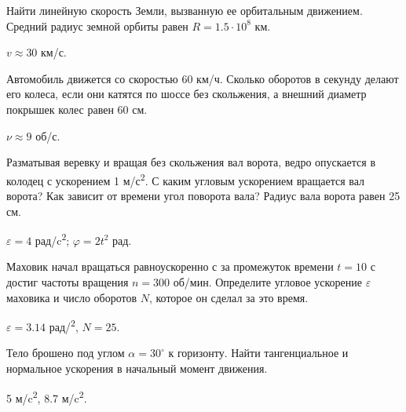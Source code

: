 \begin{ex} %
Найти линейную скорость Земли, вызванную ее орбитальным движением. Средний радиус земной орбиты равен $R = 1.5 \cdot 10^8$ км.
\begin{ans}
$v \approx 30$ км/с.
\end{ans}
\end{ex}

\begin{ex} %
Автомобиль движется со скоростью 60 км/ч. Сколько оборотов в секунду делают его колеса, если они катятся по шоссе без скольжения, а внешний диаметр покрышек колес равен 60 см.
\begin{ans}
$\nu \approx 9$ об/с.
\end{ans}
\end{ex}

\begin{ex} %
Разматывая веревку и вращая без скольжения вал ворота, ведро опускается в колодец с ускорением 1 м/с\textsuperscript{2}. С каким угловым ускорением вращается вал ворота? Как зависит от времени угол поворота вала? Радиус вала ворота равен 25 см.
\begin{ans}
$\varepsilon = 4$ рад/c\textsuperscript{2}; $\varphi = 2t^2$ рад.
\end{ans}
\end{ex}

\begin{ex} %
Маховик начал вращаться равноускоренно с за промежуток времени $t=10$ с достиг частоты вращения $n=300$ об/мин. Определите угловое ускорение $\varepsilon$ маховика и число оборотов $N$, которое он сделал за это время.
\begin{ans}
$\varepsilon =  3.14$ рад/\textsuperscript{2}, $N = 25$.
\end{ans}
\end{ex}

\begin{ex} %
Тело брошено под углом $\alpha = 30^{\circ}$ к горизонту. Найти тангенциальное и нормальное ускорения в начальный момент движения.
\begin{ans}
5 м/c\textsuperscript{2}, 8.7 м/c\textsuperscript{2}.
\end{ans}
\end{ex}

